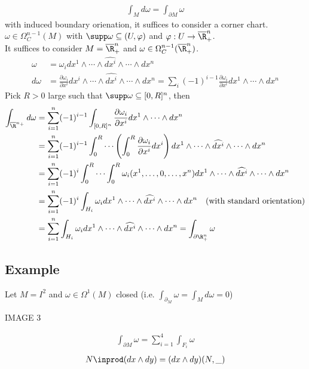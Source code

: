 \documentclass[11pt]{article}
\begin{document}
\begin{align*}
  \int_{M}d\omega
  =\int_{\partial M}\omega
\end{align*}
with induced boundary orienation, it suffices to consider a corner chart. \(\omega\in\Omega^{n-1}_{C}(M)\) with \(\supp\omega\subseteq(U,\varphi)\) and \(\varphi:U\to\overline{\R}^{n}_{+}\).\\
It suffices to consider \(M=\overline{\R}^{n}_{+}\) and \(\omega\in\Omega_{C}^{n-1}(\overline{\R}^{n}_{+})\).\\
\begin{align*}
  \omega
  &=\omega_{i}dx^{1}\wedge\cdots\wedge\widehat{dx^{i}}\wedge\cdots\wedge dx^{n} \\
  d\omega
  &=\frac{\partial \omega_{i}}{\partial x^{i}}dx^{i}\wedge\cdots\wedge\widehat{dx^{i}}\wedge\cdots\wedge dx^{n}
  =\sum_{i}(-1)^{i-1}\frac{\partial\omega_{i}}{\partial x^{i}}dx^{1}\wedge\cdots\wedge dx^{n}
\end{align*}
Pick \(R>0\) large such that \(\supp\omega\subseteq[0,R]^{n}\), then\\
\begin{align*}
  \int_{\overline{\R}^{n_{+}}}d\omega
  &=\sum_{i=1}^{n}(-1)^{i-1}\int_{[0,R]^{n}}\frac{\partial\omega_{i}}{\partial x^{i}}dx^{1}\wedge\cdots\wedge dx^{n} \\
  &=\sum_{i=1}^{n}(-1)^{i-1}\int_{0}^{R}\cdots\left( \int_{0}^{R}\frac{\partial\omega_{i}}{\partial x^{i}}dx^{i} \right)dx^{1}\wedge\cdots\wedge\widehat{dx^{i}}\wedge\cdots\wedge dx^{n} \\
  &=\sum_{i=1}^{n}(-1)^{i}\int_{0}^{R}\cdots\int_{0}^{R}\omega_{i}(x^{1},\ldots,0,\ldots,x^{n})dx^{1}\wedge\cdots\wedge\widehat{dx^{i}}\wedge\cdots\wedge dx^{n} \\
  &=\sum_{i=1}^{n}(-1)^{i}\int_{H_{i}}\omega_{i}dx^{1}\wedge\cdots\wedge\widehat{dx^{i}}\wedge\cdots\wedge dx^{n}\quad\text{(with standard orientation)} \\
  &=\sum_{i=1}^{n}\int_{H_{i}}\omega_{i}dx^{1}\wedge\cdots\wedge\widehat{dx^{i}}\wedge\cdots\wedge dx^{n}
  =\int_{\partial\R^{n}_{+}}\omega
\end{align*}
\subsection*{Example}
\label{sec:org995871b}
Let \(M=I^{2}\) and \(\omega\in\Omega^{1}(M)\) closed (i.e. \(\int_{\partial _{M}}\omega=\int_{M}d\omega=0\))\\
\begin{center}
IMAGE 3\\
\end{center}
\begin{align*}
  \int_{\partial M}\omega
  =\sum_{i=1}^{4}\int_{F_{i}}\omega
\end{align*}
\begin{align*}
  N\inprod(dx\wedge dy)=(dx\wedge dy)(N,\_{})
\end{align*}
\end{document}
